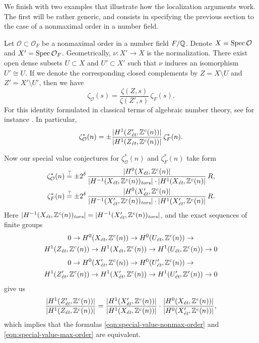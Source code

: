 \documentclass[draft]{article}
\numberwithin{equation}{section}
\begin{document}
We finish with two examples that illustrate how the localization arguments
work. The first will be rather generic, and consists in specifying the previous
section to the case of a nonmaximal order in a number field.

\begin{example}
  Let $\mathcal{O} \subset \mathcal{O}_F$ be a nonmaximal order in a number
  field $F/\QQ$. Denote $X = \Spec \mathcal{O}$ and
  $X' = \Spec \mathcal{O}_F$. Geometrically, $\nu\colon X' \to X$ is the
  normalization. There exist open dense subsets $U \subset X$ and
  $U' \subset X'$ such that $\nu$ induces an isomorphism $U' \cong U$. If we
  denote the corresponding closed complements by $Z = X\setminus U$ and
  $Z' = X'\setminus U'$, then we have
  $$\zeta_\mathcal{O} (s) = \frac{\zeta (Z,s)}{\zeta (Z',s)}\,\zeta_F (s).$$
  For this identity formulated in classical terms of algebraic number theory,
  see for instance \cite{Jenner-1969}. In particular,
  \[ \zeta^*_\mathcal{O} (n) =
    \pm \frac{|H^1 (Z'_\et, \ZZ^c(n))|}{|H^1 (Z_\et, \ZZ^c(n))|}\,\zeta^*_F (n). \]

  Now our special value conjectures for $\zeta^*_\mathcal{O} (n)$ and
  $\zeta^*_F (n)$ take form
  \begin{align}
    \label{eqn:special-value-nonmax-order}
    \zeta^*_\mathcal{O} (n) & \stackrel{?}{=}
                              \pm 2^\delta\,\frac{|H^0 (X_\et, \ZZ^c (n)|}{|H^{-1} (X_\et, \ZZ^c (n))_\tors|\cdot |H^1 (X_\et, \ZZ^c (n)|}\,R, \\
    \label{eqn:special-value-max-order}
    \zeta^*_F (n) & \stackrel{?}{=}
                    \pm 2^\delta\,\frac{|H^0 (X'_\et, \ZZ^c (n)|}{|H^{-1} (X'_\et, \ZZ^c (n))_\tors|\cdot |H^1 (X'_\et, \ZZ^c (n)|}\,R.
  \end{align}
  Here
  $|H^{-1} (X_\et, \ZZ^c (n))_\tors| = |H^{-1} (X'_\et, \ZZ^c (n))_\tors|$, and
  the exact sequences of finite groups
  \begin{multline*}
    0 \to H^0 (X_\et, \ZZ^c (n)) \to H^0 (U_\et, \ZZ^c (n)) \to \\
    H^1 (Z_\et, \ZZ^c (n)) \to H^1 (X_\et, \ZZ^c (n)) \to H^1 (U_\et, \ZZ^c (n)) \to 0
  \end{multline*}
  \begin{multline*}
    0 \to H^0 (X'_\et, \ZZ^c (n)) \to H^0 (U'_\et, \ZZ^c (n)) \to \\
    H^1 (Z'_\et, \ZZ^c (n)) \to H^1 (X'_\et, \ZZ^c (n)) \to H^1 (U'_\et, \ZZ^c (n)) \to 0
  \end{multline*}
  give us
  \[ \frac{|H^1 (Z'_\et, \ZZ^c (n))|}{|H^1 (Z_\et, \ZZ^c (n))|} =
    \frac{|H^1 (X'_\et, \ZZ^c (n))|}{|H^1 (X_\et, \ZZ^c (n))|}\cdot
    \frac{|H^0 (X_\et, \ZZ^c (n))|}{|H^0 (X'_\et, \ZZ^c (n))|}, \]
  which implies that the formulas \eqref{eqn:special-value-nonmax-order} and
  \eqref{eqn:special-value-max-order} are equivalent.
\end{example}
\end{document}
